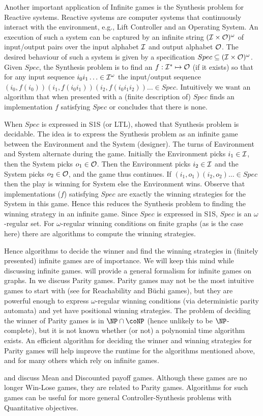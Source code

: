 Another important application of Infinite games is the Synthesis problem for Reactive systems. Reactive systems are computer systems that continuously interact with the environment, e.g., Lift Controller and an Operating System. An execution of such a system can be captured by an infinite string $(\mathcal{I} \times \mathcal{O})^\omega$ of input/output pairs over the input alphabet $\mathcal{I}$ and output alphabet $\mathcal{O}$. The desired behaviour of such a system is given by a specification $Spec \subseteq (\mathcal{I} \times \mathcal{O})^\omega$. Given $Spec$, the Synthesis problem is to find an $f: \mathcal{I}^* \mapsto \mathcal{O}$ (if it exists)  so that for any input sequence $i_0i_1 \ldots \in \mathcal{I}^\omega$ the input/output sequence  $(i_0,f(i_0))(i_1,f(i_0i_1))(i_2,f(i_0i_1i_2)) \ldots \in Spec$. Intuitively we want an algorithm that when presented with a (finite description of) $Spec$ finds an implementation $f$ satisfying $Spec$ or concludes that there is none.

When $Spec$ is expressed in S1S (or LTL), \cite{synthesis} showed that Synthesis problem is decidable. The idea is to express the Synthesis problem as an infinite game between the Environment and the System (designer). The turns of Environment and System alternate during the game. Initially the Environment picks $i_1 \in \mathcal{I}$, then the System picks $o_1 \in \mathcal{O}$. Then the Environment picks $i_2 \in \mathcal{I}$ and the System picks $o_2 \in \mathcal{O}$, and the game thus continues. If $(i_1,o_1)(i_2,o_2) \ldots \in Spec$ then the play is winning for System else the Environment wins. Observe that implementations ($f$) satisfying $Spec$ are exactly the winning strategies for the System in this game. Hence this reduces the Synthesis problem to finding the winning strategy in an infinite game. Since $Spec$ is expressed in S1S, $Spec$ is an $\omega$-regular set. For $\omega$-regular winning conditions on finite graphs (as is the case here) there are algorithms to compute the winning strategies.

Hence algorithms to decide the winner and find the winning strategies in (finitely presented) infinite games are of importance. We will keep this mind while discussing infinite games.  will provide a general formalism for infinite games on graphs. In  we discuss Parity games. Parity games may not be the most intuitive games to start with (see \cite[Chap~2]{thomas2002automata} for Reachability and B\"uchi games), but they are powerful enough to express $\omega$-regular winning conditions (via deterministic parity automata) and yet have positional winning strategies. The problem of deciding the winner of Parity games is in $\NP \cap \coNP$ (hence unlikely to be $\NP$-complete), but it is not known whether (or not) a polynomial time algorithm exists. An efficient algorithm for deciding the winner and winning strategies for Parity games will help improve the runtime for the algorithms mentioned above, and for many others which rely on infinite games.

 and  discuss Mean and Discounted payoff games. Although these games are no longer Win-Lose games, they are related to Parity games. Algorithms for such games can be useful for more general Controller-Synthesis problems with Quantitative objectives.

